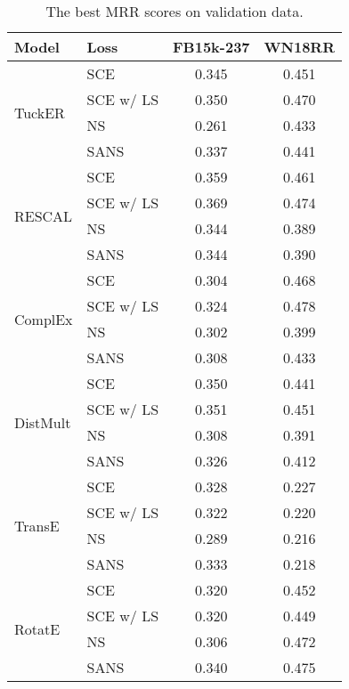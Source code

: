 \begin{table*}[h!]
\centering
\small
\begin{tabular}{llcc}
\toprule
             \textbf{Model}       &  \textbf{Loss} & \textbf{FB15k-237} & \textbf{WN18RR} \\
\midrule
\multirow{4}{*}{TuckER}  & SCE       & 0.345     & 0.451  \\
                         & SCE w/ LS & 0.350     & 0.470  \\
                         & NS        & 0.261     & 0.433  \\
                         & SANS      & 0.337     & 0.441  \\
\midrule
\multirow{4}{*}{RESCAL}  & SCE       & 0.359     & 0.461  \\
                         & SCE w/ LS & 0.369     & 0.474  \\
                         & NS        & 0.344     & 0.389  \\
                         & SANS      & 0.344     & 0.390  \\
\midrule
\multirow{4}{*}{ComplEx} & SCE       & 0.304     & 0.468  \\
                         & SCE w/ LS & 0.324     & 0.478  \\
                         & NS        & 0.302     & 0.399  \\
                         & SANS      & 0.308     & 0.433  \\
\midrule
\multirow{4}{*}{DistMult} & SCE      & 0.350    & 0.441  \\
                         & SCE w/ LS & 0.351    & 0.451  \\
                         & NS        & 0.308    & 0.391  \\
                         & SANS      & 0.326    & 0.412  \\
\midrule
\multirow{4}{*}{TransE} & SCE       & 0.328 & 0.227 \\
                         & SCE w/ LS & 0.322 & 0.220 \\
                         & NS        & 0.289 & 0.216 \\
                         & SANS      & 0.333 & 0.218 \\
\midrule
\multirow{4}{*}{RotatE}  & SCE       & 0.320     & 0.452  \\
                         & SCE w/ LS & 0.320     & 0.449  \\
                         & NS        & 0.306     & 0.472  \\
                         & SANS      & 0.340     & 0.475  \\
\bottomrule
\end{tabular}
\caption{The best MRR scores on validation data.}
\label{tab:valid}
\end{table*}

